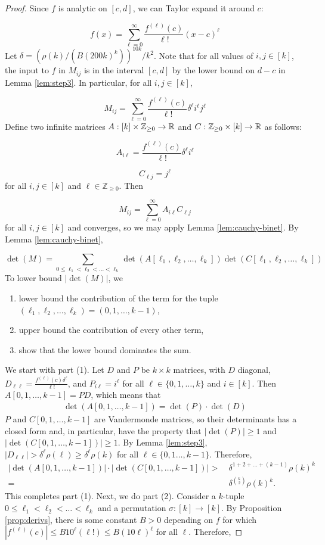 \begin{proof}
Since $f$ is analytic on $[c,d]$, we can Taylor expand it around $c$:

$$f(x) = \sum_{\ell=0}^{\infty} \frac{f^{(\ell)}(c)}{\ell!} (x - c)^\ell$$
Let $\delta = (\rho(k)/(B(200k)^k))^{10k}/k^2$. Note that for all values of $i,j\in [k]$, the input to $f$ in $M_{ij}$ is in the interval $[c,d]$ by the lower bound on $d - c$ in Lemma \ref{lem:step3}. In particular, for all $i,j\in [k]$,

$$M_{ij} = \sum_{\ell=0}^{\infty} \frac{f^{(\ell)}(c)}{\ell!} \delta^{\ell} i^{\ell} j^{\ell}$$
Define two infinite matrices $A: [k]\times \mathbb Z_{\ge 0} \rightarrow {\mathbb R}$ and $C: \mathbb Z_{\ge 0}\times [k] \rightarrow {\mathbb R}$ as follows:

$$A_{i\ell} = \frac{f^{(\ell)}(c)}{\ell!} \delta^{\ell} i^{\ell}$$

$$C_{\ell j} = j^{\ell}$$
for all $i,j\in [k]$ and $\ell\in \mathbb Z_{\ge 0}$. Then

$$M_{ij} = \sum_{\ell=0}^{\infty} A_{i\ell}C_{\ell j}$$
for all $i,j\in [k]$ and converges, so we may apply Lemma \ref{lem:cauchy-binet}. By Lemma \ref{lem:cauchy-binet},

$$\det(M) = \sum_{0\le \ell_1 < \ell_2 < \hdots < \ell_k} \det(A[\ell_1, \ell_2, \hdots, \ell_k]) \det(C[\ell_1, \ell_2, \hdots, \ell_k])$$
To lower bound $|\det(M)|$, we 
\begin{enumerate}[(1)]
    \item lower bound the contribution of the term for the tuple $(\ell_1, \ell_2, \hdots, \ell_k) = (0, 1, \hdots, k-1)$,
    \item upper bound the contribution of every other term,
    \item  show that the lower bound dominates the sum.
\end{enumerate} 
We start with part (1). Let $D$ and $P$ be $k\times k$ matrices, with $D$ diagonal, $D_{\ell\ell} = \frac{f^{(\ell)}(c)\delta^{\ell}}{\ell!}$, and $P_{i\ell} = i^{\ell}$ for all $\ell\in \{0,1,\hdots,k\}$ and $i\in [k]$. Then $A[0,1,\hdots,k-1] = P D$, which means that
\begin{align*}
\det(A[0,1,\hdots,k-1]) = \det(P) \cdot \det(D)
\end{align*}
$P$ and $C[0,1,\hdots,k-1]$ are Vandermonde matrices, so their determinants has a closed form and, in particular, have the property that $|\det(P)| \ge 1$ and $|\det(C[0,1,\hdots,k-1])| \ge 1$. By Lemma \ref{lem:step3}, $|D_{\ell\ell}| > \delta^\ell \rho(\ell) \ge \delta^{\ell}\rho(k)$ for all $\ell\in \{0,1\hdots,k-1\}$. Therefore,
\begin{align*}
|\det(A[0,1,\hdots,k-1])| \cdot |\det(C[0,1,\hdots,k-1])| 
> & ~ \delta^{1 + 2 + \hdots + (k-1)} \rho(k)^k \\
= & ~ \delta^{\binom{k}{2}} \rho(k)^k.
\end{align*}
This completes part (1). Next, we do part (2). Consider a $k$-tuple $0\le \ell_1 < \ell_2 < \hdots < \ell_k$ and a permutation $\sigma: [k]\rightarrow [k]$. By Proposition \ref{prop:derivs}, there is some constant $B > 0$ depending on $f$ for which $|f^{(\ell)}(c)|\le B 10^{\ell}(\ell!)\le B(10\ell)^{\ell}$ for all $\ell$. Therefore,


\end{proof}
